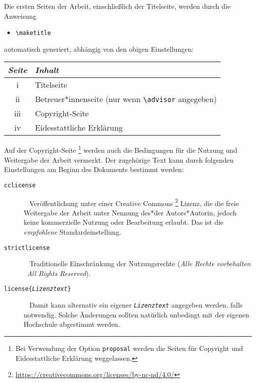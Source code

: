 Die ersten Seiten der Arbeit, einschließlich der Titelseite, werden durch die
Anweisung
%
\begin{itemize}
    \item[] \verb!\maketitle!
\end{itemize}
%
automatisch generiert, abhängig von den obigen Einstellungen:
%
\begin{center}
    \begin{tabular}{@{}cl@{}}
        \toprule
        \emph{Seite} & \emph{Inhalt} \\
        \midrule
        \textrm{i}   & Titelseite \\
        \textrm{ii}  & Betreuer*innenseite (nur wenn \verb!\advisor!
                       angegeben) \\
        \textrm{iii} & Copyright-Seite\\
        \textrm{iv}  & Eidesstattliche Erklärung\\
        \bottomrule
    \end{tabular}
\end{center}
%
Auf der Copyright-Seite%
\footnote{Bei Verwendung der Option \texttt{proposal} werden die Seiten für
Copyright und Eidesstattliche Erklärung weggelassen.}
werden auch die Bedingungen für die Nutzung und
Weitergabe der Arbeit vermerkt. Der zugehörige Text kann durch folgenden
Einstellungen am Beginn des Dokuments bestimmt werden:
%
\begin{description}
    \item[\normalfont\texttt{{\bs}cclicense}] ~ \newline
    Veröffentlichung unter einer Creative Commons%
    \footnote{\url{https://creativecommons.org/licenses/by-nc-nd/4.0/}}
    Lizenz, die die freie Weitergabe der Arbeit unter Nennung des*der
    Autors*Autorin, jedoch keine kommerzielle Nutzung oder Bearbeitung erlaubt.
    Das ist die \emph{empfohlene} Standardeinstellung.
    \item[\normalfont\texttt{{\bs}strictlicense}] ~ \newline
    Traditionelle Einschränkung der Nutzungsrechte
    (\emph{Alle Rechte vorbehalten} \bzw\ \emph{All Rights Reserved}).
    \item[\normalfont\texttt{{\bs}license\{\emph{Lizenztext}\}}] ~ \newline
    Damit kann alternativ ein eigener \texttt{\emph{Lizenztext}} angegeben
    werden, falls notwendig. Solche Änderungen sollten natürlich unbedingt
    mit der eigenen Hochschule abgestimmt werden.
\end{description}

